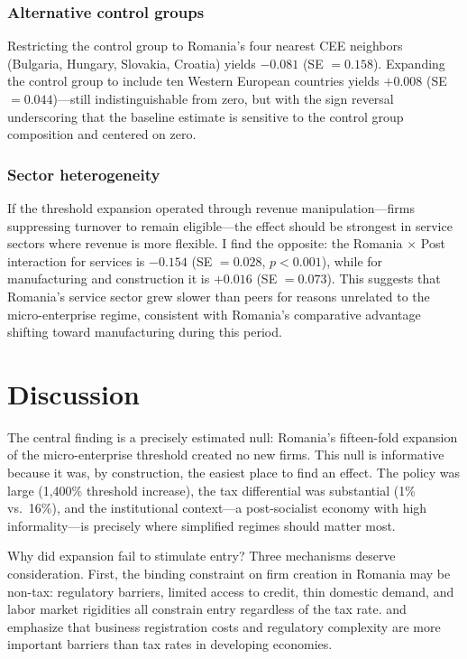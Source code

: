 \documentclass[12pt]{article}
\begin{document}
\subsubsection*{Alternative control groups} Restricting the control group to Romania's four nearest CEE neighbors (Bulgaria, Hungary, Slovakia, Croatia) yields $-0.081$ (SE $= 0.158$). Expanding the control group to include ten Western European countries yields $+0.008$ (SE $= 0.044$)---still indistinguishable from zero, but with the sign reversal underscoring that the baseline estimate is sensitive to the control group composition and centered on zero.

\subsubsection*{Sector heterogeneity} If the threshold expansion operated through revenue manipulation---firms suppressing turnover to remain eligible---the effect should be strongest in service sectors where revenue is more flexible. I find the opposite: the Romania $\times$ Post interaction for services is $-0.154$ (SE $= 0.028$, $p < 0.001$), while for manufacturing and construction it is $+0.016$ (SE $= 0.073$). This suggests that Romania's service sector grew slower than peers for reasons unrelated to the micro-enterprise regime, consistent with Romania's comparative advantage shifting toward manufacturing during this period.


\section{Discussion}
\label{sec:discussion}

The central finding is a precisely estimated null: Romania's fifteen-fold expansion of the micro-enterprise threshold created no new firms. This null is informative because it was, by construction, the easiest place to find an effect. The policy was large (1,400\% threshold increase), the tax differential was substantial (1\% vs.~16\%), and the institutional context---a post-socialist economy with high informality---is precisely where simplified regimes should matter most.

Why did expansion fail to stimulate entry? Three mechanisms deserve consideration. First, the binding constraint on firm creation in Romania may be non-tax: regulatory barriers, limited access to credit, thin domestic demand, and labor market rigidities all constrain entry regardless of the tax rate. \citet{djankov2002regulation} and \citet{klapper2006entry} emphasize that business registration costs and regulatory complexity are more important barriers than tax rates in developing economies.
\end{document}
